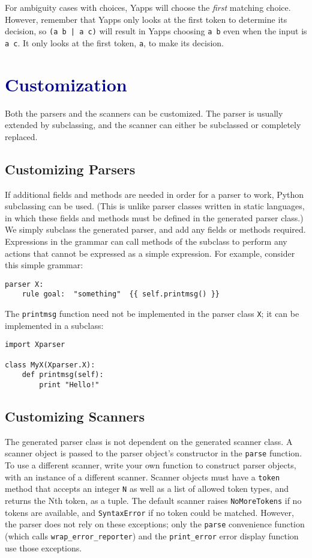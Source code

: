 \documentclass[10pt]{article}
\newcommand{\mysection}[1]{\section{\textcolor{darkblue}{#1}}}
\newcommand{\mysubsection}[1]{\subsection{\textcolor{darkerblue}{#1}}}
\begin{document}
For ambiguity cases with choices, Yapps will choose the \emph{first}
matching choice.  However, remember that Yapps only looks at the first 
token to determine its decision, so {\tt (a b | a c)} will result in
Yapps choosing {\tt a b} even when the input is {\tt a c}.  It only
looks at the first token, {\tt a}, to make its decision.

\mysection{Customization}

Both the parsers and the scanners can be customized.  The parser is
usually extended by subclassing, and the scanner can either be
subclassed or completely replaced.

\mysubsection{Customizing Parsers}

If additional fields and methods are needed in order for a parser to
work, Python subclassing can be used.  (This is unlike parser classes
written in static languages, in which these fields and methods must be
defined in the generated parser class.)  We simply subclass the
generated parser, and add any fields or methods required.  Expressions
in the grammar can call methods of the subclass to perform any actions
that cannot be expressed as a simple expression.  For example,
consider this simple grammar:

\begin{verbatim}
parser X:
    rule goal:  "something"  {{ self.printmsg() }}
\end{verbatim}

The \texttt{printmsg} function need not be implemented in the parser
class \texttt{X}; it can be implemented in a subclass:

\begin{verbatim}
import Xparser

class MyX(Xparser.X):
    def printmsg(self):
        print "Hello!"
\end{verbatim}

\mysubsection{Customizing Scanners}

The generated parser class is not dependent on the generated scanner
class.  A scanner object is passed to the parser object's constructor
in the \texttt{parse} function.  To use a different scanner, write
your own function to construct parser objects, with an instance of a
different scanner.  Scanner objects must have a \texttt{token} method
that accepts an integer \texttt{N} as well as a list of allowed token
types, and returns the Nth token, as a tuple.  The default scanner
raises \texttt{NoMoreTokens} if no tokens are available, and
\texttt{SyntaxError} if no token could be matched.  However, the
parser does not rely on these exceptions; only the \texttt{parse}
convenience function (which calls \texttt{wrap\_error\_reporter}) and
the \texttt{print\_error} error display function use those exceptions.
\end{document}
